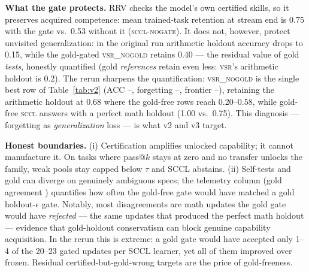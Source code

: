 \documentclass[10pt,conference]{IEEEtran}
\newcommand{\vtwovsrnogoldacc}{--}\newcommand{\vtwovsrnogoldbwt}{--}\newcommand{\vtwovsrnogoldforget}{--}\newcommand{\vtwovsrnogoldfrontier}{--}%
\begin{document}
\textbf{What the gate protects.} RRV checks the model's own certified skills, so it preserves acquired competence: mean trained-task retention at stream end is 0.75 with the gate vs.\ 0.53 without it (\textsc{sccl-nogate}). It does not, however, protect unvisited generalization: in the original run arithmetic holdout accuracy drops to 0.15, while the gold-gated \textsc{vsr\_nogold} retains 0.40 --- the residual value of gold \emph{tests}, honestly quantified (gold \emph{references} retain even less: \textsc{vsr}'s arithmetic holdout is 0.2). The rerun sharpens the quantification: \textsc{vsr\_nogold} is the single best row of Table~\ref{tab:v2} (ACC \vtwovsrnogoldacc, forgetting \vtwovsrnogoldforget, frontier \vtwovsrnogoldfrontier), retaining the arithmetic holdout at 0.68 where the gold-free rows reach 0.20--0.58, while gold-free \textsc{sccl} answers with a perfect math holdout (1.00 vs.\ 0.75). This diagnosis --- forgetting as \emph{generalization} loss --- is what v2 and v3 target.

\textbf{Honest boundaries.} (i) Certification amplifies unlocked capability; it cannot manufacture it. On tasks where pass@$k$ stays at zero and no transfer unlocks the family, weak pools stay capped below $\tau$ and SCCL abstains. (ii) Self-tests and gold can diverge on genuinely ambiguous specs; the telemetry column (gold agreement \scclgoldagree) quantifies how often the gold-free gate would have matched a gold holdout-$\epsilon$ gate. Notably, most disagreements are math updates the gold gate would have \emph{rejected} --- the same updates that produced the perfect math holdout --- evidence that gold-holdout conservatism can block genuine capability acquisition. In the rerun this is extreme: a gold gate would have accepted only 1--4 of the 20--23 gated updates per SCCL learner, yet all of them improved over frozen. Residual certified-but-gold-wrong targets are the price of gold-freeness.
\end{document}
